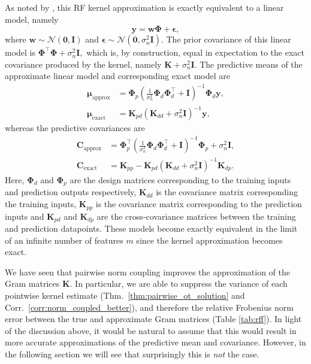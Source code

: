 As noted by \citet{lazaro2010sparse}, this RF kernel approximation is exactly equivalent to a linear model, namely 
\begin{equation}
    \boldsymbol{y} = \boldsymbol{w} \boldsymbol{\Phi} + \boldsymbol{\epsilon},
\end{equation}
where $\boldsymbol{w} \sim \mathcal{N}(\boldsymbol{0}, \mathbf{I})$ and $\boldsymbol{\epsilon} \sim \mathcal{N}(\boldsymbol{0}, \sigma_n^2\mathbf{I}).$
The prior covariance of this linear model is $\boldsymbol{\Phi}^\top \boldsymbol{\Phi}  + \sigma_n^2 \mathbf{I},$ which is, by construction, equal in expectation to the exact covariance produced by the kernel, namely $\mathbf{K} + \sigma_n^2 \mathbf{I}$.
The predictive means of the approximate linear model and corresponding exact model are
\begin{align} \label{eq:mua1}
    \boldsymbol{\mu}_{\text{approx}} &= \boldsymbol{\Phi}_p\left(\frac{1}{\sigma_n^2}\boldsymbol{\Phi}_d \boldsymbol{\Phi}_d^\top + \boldsymbol{I}\right)^{-1}\boldsymbol{\Phi}_d\boldsymbol{y}, \\
    \boldsymbol{\mu}_{\text{exact}} &= \mathbf{K}_{pd} (\mathbf{K}_{dd} + \sigma_n^2 \mathbf{I})^{-1}\boldsymbol{y},
\end{align}
whereas the predictive covariances are
\begin{align} \label{eq:Ca1}
    \mathbf{C}_{\text{approx}} &= \boldsymbol{\Phi}_p^\top \left(\frac{1}{\sigma_n^2}\boldsymbol{\Phi}_d \boldsymbol{\Phi}_d^\top + \boldsymbol{I}\right)^{-1} \boldsymbol{\Phi}_p + \sigma_n^2 \mathbf{I}, \\
    \mathbf{C}_{\text{exact}} &= \mathbf{K}_{pp} - \mathbf{K}_{pd} (\mathbf{K}_{dd} + \sigma_n^2 \mathbf{I})^{-1}\mathbf{K}_{dp}.
\end{align}
Here, $\boldsymbol{\Phi}_d$ and $\boldsymbol{\Phi}_p$ are the design matrices corresponding to the training inputs and prediction outputs respectively, $\mathbf{K}_{dd}$ is the covariance matrix corresponding the training inputs, $\mathbf{K}_{pp}$ is the covariance matrix corresponding to the prediction inputs and $\mathbf{K}_{pd}$ and $\mathbf{K}_{dp}$ are the cross-covariance matrices between the training and prediction datapoints.
These models become exactly equivalent in the limit of an infinite number of features $m$ since the kernel approximation becomes exact.

We have seen that pairwise norm coupling improves the approximation of the Gram matrices $\mathbf{K}$. 
In particular, we are able to suppress the variance of each pointwise kernel estimate (Thm.~\ref{thm:pairwise_ot_solution} and Corr.~\ref{corr:norm_coupled_better}), and therefore the relative Frobenius norm error between the true and approximate Gram matrices (Table \ref{tab:rff}). 
In light of the discussion above, it would be natural to assume that this would result in more accurate approximations of the predictive mean and covariance.
However, in the following section we will see that surprisingly this is \emph{not} the case.

